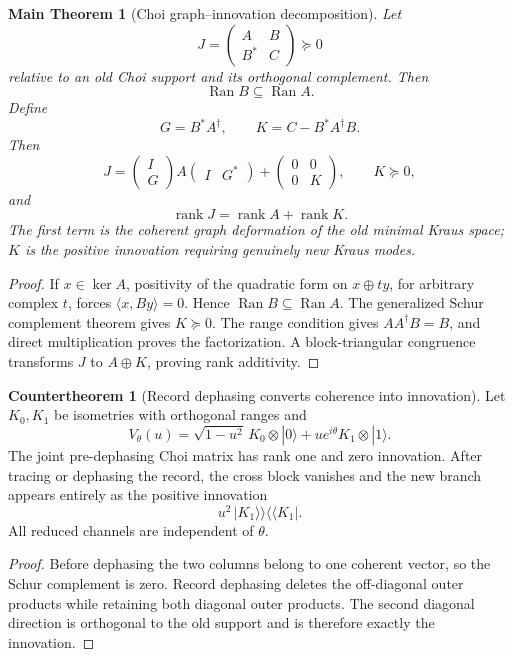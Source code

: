 \documentclass[11pt,oneside,openany]{book}
\numberwithin{equation}{chapter}
\newtheorem{maintheorem}[theorem]{Main Theorem}
\theoremstyle{definition}
\newtheorem{countertheorem}[theorem]{Countertheorem}
\theoremstyle{remark}
\newcommand{\rank}{\operatorname{rank}}
\newcommand{\Ran}{\operatorname{Ran}}
\begin{document}
\begin{maintheorem}[Choi graph--innovation decomposition]
\label{thm:v6-choi-graph-innovation}
Let
\[
 J=\begin{pmatrix}A&B\\B^*&C\end{pmatrix}\succeq0
\]
relative to an old Choi support and its orthogonal complement.  Then
\[
 \Ran B\subseteq\Ran A.
\]
Define
\[
 G=B^*A^\dagger,
 \qquad
 K=C-B^*A^\dagger B.
\]
Then
\[
 \boxed{
 J=
 \begin{pmatrix}I\\G\end{pmatrix}
 A
 \begin{pmatrix}I&G^*\end{pmatrix}
 +
 \begin{pmatrix}0&0\\0&K\end{pmatrix},
 \qquad K\succeq0,}
\]
and
\[
 \boxed{\rank J=\rank A+\rank K.}
\]
The first term is the coherent graph deformation of the old minimal Kraus
space; \(K\) is the positive innovation requiring genuinely new Kraus modes.
\end{maintheorem}

\begin{proof}
If \(x\in\ker A\), positivity of the quadratic form on
\(x\oplus ty\), for arbitrary complex \(t\), forces
\(\langle x,By\rangle=0\).  Hence \(\Ran B\subseteq\Ran A\).
The generalized Schur complement theorem gives \(K\succeq0\).  The range
condition gives \(AA^\dagger B=B\), and direct multiplication proves the
factorization.  A block-triangular congruence transforms \(J\) to
\(A\oplus K\), proving rank additivity.
\end{proof}

\begin{countertheorem}[Record dephasing converts coherence into innovation]
\label{cth:v6-record-dephasing}
Let \(K_0,K_1\) be isometries with orthogonal ranges and
\[
 V_\theta(u)=\sqrt{1-u^2}\,K_0\otimes|0\rangle
 +ue^{i\theta}K_1\otimes|1\rangle.
\]
The joint pre-dephasing Choi matrix has rank one and zero innovation.  After
tracing or dephasing the record, the cross block vanishes and the new branch
appears entirely as the positive innovation
\[
 u^2\,|K_1\rangle\!\rangle\langle\!\langle K_1|.
\]
All reduced channels are independent of \(\theta\).
\end{countertheorem}

\begin{proof}
Before dephasing the two columns belong to one coherent vector, so the Schur
complement is zero.  Record dephasing deletes the off-diagonal outer products
while retaining both diagonal outer products.  The second diagonal direction
is orthogonal to the old support and is therefore exactly the innovation.
\end{proof}
\end{document}
